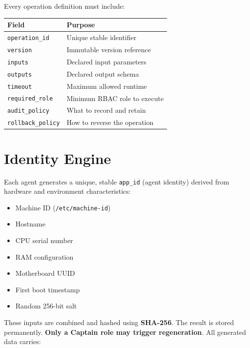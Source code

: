\documentclass[12pt,a4paper]{article}
\begin{document}
Every operation definition must include:

\begin{center}
\begin{tabularx}{0.75\textwidth}{lX}
\toprule
Field & Purpose \\
\midrule
\texttt{operation\_id}  & Unique stable identifier \\
\texttt{version}        & Immutable version reference \\
\texttt{inputs}         & Declared input parameters \\
\texttt{outputs}        & Declared output schema \\
\texttt{timeout}        & Maximum allowed runtime \\
\texttt{required\_role} & Minimum RBAC role to execute \\
\texttt{audit\_policy}  & What to record and retain \\
\texttt{rollback\_policy} & How to reverse the operation \\
\bottomrule
\end{tabularx}
\end{center}

\section{Identity Engine}

Each agent generates a unique, stable \texttt{app\_id} (agent identity) derived from hardware and environment characteristics:

\begin{itemize}[noitemsep]
    \item Machine ID (\texttt{/etc/machine-id})
    \item Hostname
    \item CPU serial number
    \item RAM configuration
    \item Motherboard UUID
    \item First boot timestamp
    \item Random 256-bit salt
\end{itemize}

These inputs are combined and hashed using \textbf{SHA-256}. The result is stored permanently. \textbf{Only a Captain role may trigger regeneration}. All generated data carries:
\end{document}
